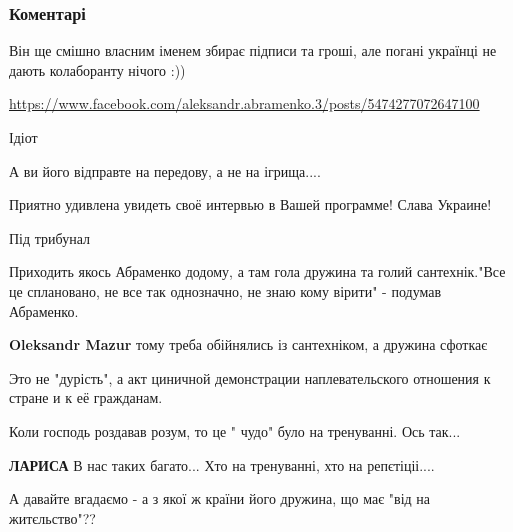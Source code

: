  
 
 
 
 
\subsubsection{Коментарі}

\begin{itemize} %

Він ще смішно власним іменем збирає підписи та гроші, але погані українці не дають колаборанту нічого :)) 

\url{https://www.facebook.com/aleksandr.abramenko.3/posts/5474277072647100}


Ідіот

А ви його відправте на передову, а не на ігрища....

Приятно удивлена увидеть своё интервью в Вашей программе!
Слава Украине!

Під трибунал


Приходить якось Абраменко додому, а там гола дружина та голий сантехнік."Все це
сплановано, не все так однозначно, не знаю кому вірити" - подумав Абраменко.

\begin{itemize} %
\textbf{Oleksandr Mazur} тому треба обійнялись із сантехніком, а дружина сфоткає
\end{itemize} %

Это не "дурість", а акт циничной демонстрации наплевательского отношения к стране и к её гражданам.

Коли господь роздавав розум, то це " чудо" було на тренуванні. Ось так...

\begin{itemize} %
\textbf{ЛАРИСА} В нас таких багато... Хто на тренуванні, хто на репєтіціі....
\end{itemize} %

А давайте вгадаємо - а з якої ж країни його дружина, що має "від на житєльство"??


\end{itemize}
